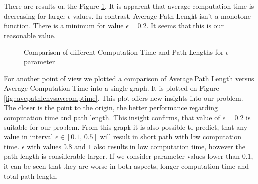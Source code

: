 \documentclass[11pt]{article}
\numberwithin{equation}{section}
\begin{document}
There are results on the Figure \ref{fig:comparison}. It is apparent that average computation time is decreasing for larger $\epsilon$ values. In contrast, Average Path Lenght isn't a monotone function. There is a minimum for value $\epsilon = 0.2$. It seems that this is our reasonable value. 
\begin{figure}[h]
	\centering
	\hfill
	\hfill
	\caption{Comparison of different Computation Time and Path Lengths for $\epsilon$ parameter}
	\label{fig:comparison}
\end{figure} 

For another point of view we plotted a comparison of Average Path Length versus Average Computation Time into a single graph. It is plotted on Figure \ref{fig::avepathlenvsavecomptime}. This plot offers new insights into our problem. The closer is the point to the origin, the better performance regarding computation time and path length. This insight confirms, that value of $\epsilon = 0.2$ is suitable for our problem. From this graph it is also possible to predict, that any value in interval $\epsilon \in \left[0.1,\,0.5\right]$ will result in short path with low computation time. $\epsilon$ with values $0.8$ and $ 1$ also results in low computation time, however the path length is considerable larger. If we consider parameter values lower than $0.1$, it can be seen that they are worse in both aspects, longer computation time and total path length. 
\end{document}
